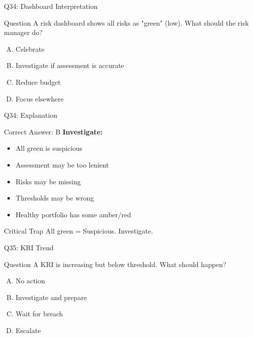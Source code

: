 \documentclass{beamer}
\begin{document}
			\begin{frame}{Q34: Dashboard Interpretation}
				\begin{block}{Question}
					A risk dashboard shows all risks as "green" (low). What should the risk manager do?
				\end{block}
				\begin{enumerate}[(A)]
					\item Celebrate
					\item Investigate if assessment is accurate
					\item Reduce budget
					\item Focus elsewhere
				\end{enumerate}
			\end{frame}
			
			\begin{frame}{Q34: Explanation}
				\begin{block}{Correct Answer: B}
					\textbf{Investigate:}
					\begin{itemize}
						\item All green is suspicious
						\item Assessment may be too lenient
						\item Risks may be missing
						\item Thresholds may be wrong
						\item Healthy portfolio has some amber/red
					\end{itemize}
				\end{block}
				\begin{alertblock}{Critical Trap}
					All green = Suspicious. Investigate.
				\end{alertblock}
			\end{frame}
			
			\begin{frame}{Q35: KRI Trend}
				\begin{block}{Question}
					A KRI is increasing but below threshold. What should happen?
				\end{block}
				\begin{enumerate}[(A)]
					\item No action
					\item Investigate and prepare
					\item Wait for breach
					\item Escalate
				\end{enumerate}
			\end{frame}
			
\end{document}
